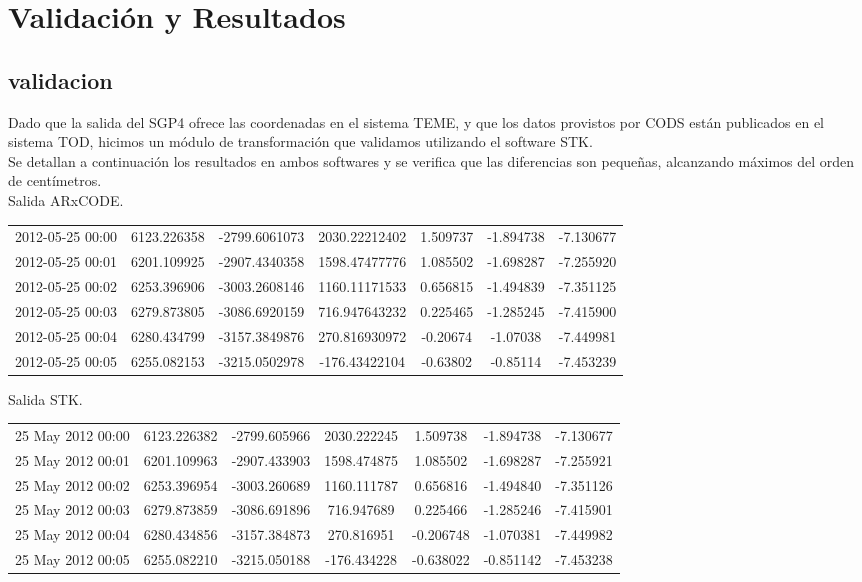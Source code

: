 \chapter{Validaci\'on y Resultados}
\label{chap:resultados}

\section{validacion}
Dado que la salida del SGP4 ofrece las coordenadas en el sistema TEME, y que los datos provistos
por CODS est\'an publicados en el sistema TOD, hicimos un m\'odulo de transformaci\'on que validamos
utilizando el software STK.\\
Se detallan a continuaci\'on los resultados en ambos softwares y se verifica que las diferencias son peque\~nas, 
alcanzando m\'aximos del orden de cent\'imetros.\\

Salida ARxCODE.\\

\begin{tabular}{lcccccc}
2012-05-25 00:00& 6123.226358& -2799.6061073& 2030.22212402& 1.509737& -1.894738& -7.130677\\
2012-05-25 00:01& 6201.109925& -2907.4340358& 1598.47477776& 1.085502& -1.698287& -7.255920\\
2012-05-25 00:02& 6253.396906& -3003.2608146& 1160.11171533& 0.656815& -1.494839& -7.351125\\
2012-05-25 00:03& 6279.873805& -3086.6920159& 716.947643232& 0.225465& -1.285245& -7.415900\\
2012-05-25 00:04& 6280.434799& -3157.3849876& 270.816930972& -0.20674& -1.07038& -7.449981\\
2012-05-25 00:05& 6255.082153& -3215.0502978& -176.43422104& -0.63802& -0.85114& -7.453239
\end{tabular}

Salida STK.\\

\begin{tabular}{lcccccc}
25 May 2012 00:00& 6123.226382& -2799.605966& 2030.222245& 1.509738& -1.894738& -7.130677\\
25 May 2012 00:01& 6201.109963& -2907.433903& 1598.474875& 1.085502& -1.698287& -7.255921\\
25 May 2012 00:02& 6253.396954& -3003.260689& 1160.111787& 0.656816& -1.494840& -7.351126\\
25 May 2012 00:03& 6279.873859& -3086.691896& 716.947689&  0.225466& -1.285246& -7.415901\\
25 May 2012 00:04& 6280.434856& -3157.384873& 270.816951& -0.206748& -1.070381& -7.449982\\
25 May 2012 00:05& 6255.082210& -3215.050188& -176.434228& -0.638022& -0.851142& -7.453238
\end{tabular}

